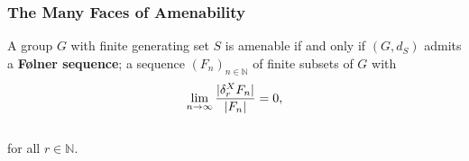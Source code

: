 \documentclass{beamer}
\DeclarePairedDelimiter{\abs}{\lvert}{\rvert}
\theoremstyle{example}
\begin{document}

\begin{frame}
\frametitle{The Many Faces of Amenability}
\begin{theorem}
A group $G$ with finite generating set $S$ is amenable if and only if $(G, d_S)$ admits a \textbf{F{\o}lner sequence}; a sequence $(F_n)_{n \in \mathbb{N}}$ of finite subsets of $G$ with\\[-1.25\baselineskip]
\begin{align*}
\begin{split}
\lim_{n\to\infty}\frac{\abs{\delta_r^X F_n}}{\abs{F_n}} = 0,
\end{split}
\end{align*}
\noindent\\[-0.5\baselineskip] for all $r \in \mathbb{N}$.
\end{theorem}
\noindent\\[0.5\baselineskip]
\end{frame}
\end{document}
